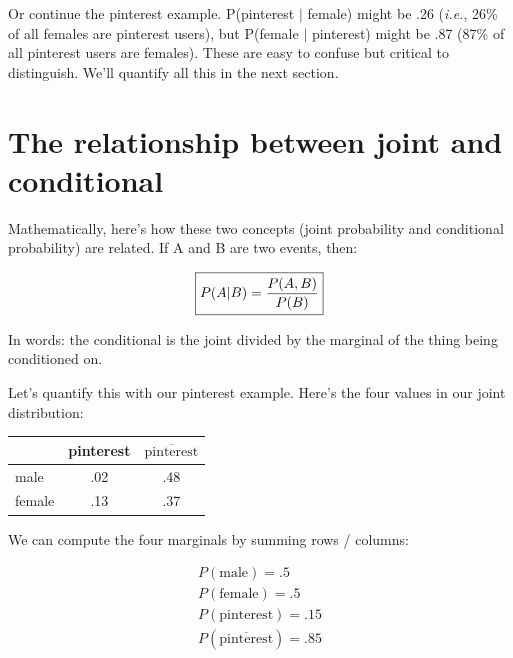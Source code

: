 Or continue the pinterest example. P(pinterest $|$ female) might be .26
(\textit{i.e.}, 26\% of all females are pinterest users), but P(female $|$
pinterest) might be .87 (87\% of all pinterest users are females). These are
easy to confuse but critical to distinguish. We'll quantify all this in the
next section.


\section{The relationship between joint and conditional}


Mathematically, here's how these two concepts (joint probability and
conditional probability) are related. If A and B are two events, then:

\setlength{\fboxsep}{3mm}
\label{condProbDef}
\vspace{-.2in}
\begin{align*}
\framebox{$P(A|B) = \dfrac{P(A,B)}{P(B)}$}
\end{align*}

In words: the conditional is the joint divided by the marginal of the thing
being conditioned on.

\begin{samepage}
Let's quantify this with our pinterest example. Here's the four values in our
joint distribution:


\begin{center}
\begin{tabular}{l|c|c}
         & pinterest & $\overline{\textrm{pinterest}}$ \\
\hline
male     &   .02     &   .48  \\
\hline
female   &   .13     &   .37  \\
\end{tabular}
\end{center}
\end{samepage}

\label{calculateMarginalConditional}

We can compute the four marginals by summing rows / columns:

\begin{align*}
P(\textrm{male}) = .5 \\
P(\textrm{female}) = .5 \\
P(\textrm{pinterest}) = .15 \\
P(\overline{\textrm{pinterest}} ) = .85 \\
\end{align*}

